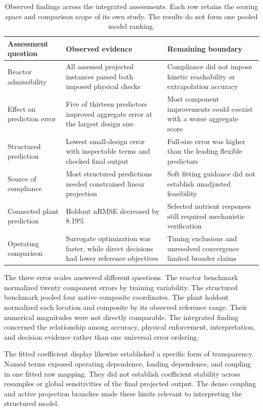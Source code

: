 \begin{table}[htbp]
\centering\small
\caption{Observed findings across the integrated assessments. Each row retains the scoring space and comparison scope of its own study. The results do not form one pooled model ranking.}
\label{tab:integrated_observed_findings}
\begin{tabular}{p{}p{}p{}}
\toprule
Assessment question & Observed evidence & Remaining boundary\\
\midrule
Reactor admissibility & All assessed projected instances passed both imposed physical checks & Compliance did not impose kinetic reachability or extrapolation accuracy\\
Effect on prediction error & Five of thirteen predictors improved aggregate error at the largest design size & Most component improvements could coexist with a worse aggregate score\\
Structured prediction & Lowest small-design error with inspectable terms and checked final output & Full-size error was higher than the leading flexible predictors\\
Source of compliance & Most structured predictions needed constrained linear projection & Soft fitting guidance did not establish unadjusted feasibility\\
Connected plant prediction & Holdout nRMSE decreased by 8.19\% & Selected nutrient responses still required mechanistic verification\\
Operating comparison & Surrogate optimization was faster, while direct decisions had lower reference objectives & Timing exclusions and unresolved convergence limited broader claims\\
\bottomrule
\end{tabular}
\end{table}

The three error scales answered different questions. The reactor benchmark normalized twenty component errors by training variability. The structured benchmark pooled four native composite coordinates. The plant holdout normalized each location and composite by its observed reference range. Their numerical magnitudes were not directly comparable. The integrated finding concerned the relationship among accuracy, physical enforcement, interpretation, and decision evidence rather than one universal error ordering.

The fitted coefficient display likewise established a specific form of transparency. Named terms exposed operating dependence, loading dependence, and coupling in one fitted raw mapping. They did not establish coefficient stability across resamples or global sensitivities of the final projected output. The dense coupling and active projection branches made these limits relevant to interpreting the structured model.

